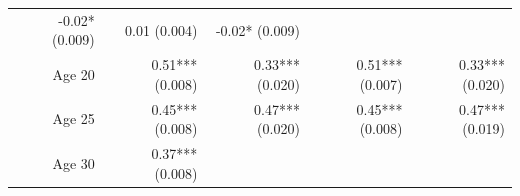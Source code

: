 \documentclass[]{article}
\begin{document}
\begin{longtable}[c]{@{}rrrrr@{}}
\begin{minipage}[t]{0.16\columnwidth}
-0.02* (0.009)
\strut\end{minipage} &
\begin{minipage}[t]{0.21\columnwidth}\raggedleft\strut
0.01 (0.004)
\strut\end{minipage} &
\begin{minipage}[t]{0.15\columnwidth}\raggedleft\strut
-0.02* (0.009)
\strut\end{minipage}\tabularnewline
\begin{minipage}[t]{0.17\columnwidth}\raggedleft\strut
Age 20
\strut\end{minipage} &
\begin{minipage}[t]{0.18\columnwidth}\raggedleft\strut
0.51*** (0.008)
\strut\end{minipage} &
\begin{minipage}[t]{0.16\columnwidth}\raggedleft\strut
0.33*** (0.020)
\strut\end{minipage} &
\begin{minipage}[t]{0.21\columnwidth}\raggedleft\strut
0.51*** (0.007)
\strut\end{minipage} &
\begin{minipage}[t]{0.15\columnwidth}\raggedleft\strut
0.33*** (0.020)
\strut\end{minipage}\tabularnewline
\begin{minipage}[t]{0.17\columnwidth}\raggedleft\strut
Age 25
\strut\end{minipage} &
\begin{minipage}[t]{0.18\columnwidth}\raggedleft\strut
0.45*** (0.008)
\strut\end{minipage} &
\begin{minipage}[t]{0.16\columnwidth}\raggedleft\strut
0.47*** (0.020)
\strut\end{minipage} &
\begin{minipage}[t]{0.21\columnwidth}\raggedleft\strut
0.45*** (0.008)
\strut\end{minipage} &
\begin{minipage}[t]{0.15\columnwidth}\raggedleft\strut
0.47*** (0.019)
\strut\end{minipage}\tabularnewline
\begin{minipage}[t]{0.17\columnwidth}\raggedleft\strut
Age 30
\strut\end{minipage} &
\begin{minipage}[t]{0.18\columnwidth}\raggedleft\strut
0.37*** (0.008)
\strut\end{minipage} &
\begin{minipage}[t]{0.16\columnwidth}\raggedleft\strut

\end{minipage}
\end{longtable}
\end{document}

